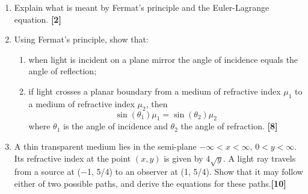 \documentclass[a4paper]{article}
\begin{document}
\newpage
\begin{qns}\leavevmode
\begin{enumerate}[label=(\alph*)]
\item Explain what is meant by Fermat’s principle and the Euler-Lagrange equation. \hfill\textbf{[2]}
\item Using Fermat’s principle, show that:
\begin{enumerate}[label=(\roman*)]
\item
when light is incident on a plane mirror the angle of incidence equals the angle of reflection;
\item if light crosses a planar boundary from a medium of refractive index $\mu_1$ to a medium of refractive index $\mu_2$, then
$$\sin(\theta_1)\mu_1=\sin(\theta_2)\mu_2$$
where $\theta_1$ is the angle of incidence and $\theta_2$ the angle of refraction. \hfill\textbf{[8]}
\end{enumerate}
\item A thin transparent medium lies in the semi-plane $−\infty < x < \infty$, $0 < y < \infty$. Its refractive index at the point $(x, y)$ is given by $4\sqrt{y}$. A light ray travels from a source at (−1, 5/4) to an observer at (1, 5/4). Show that it may follow either of two possible paths, and derive the equations for these paths.\hfill\textbf{[10]}
\end{enumerate}
\end{qns}
\end{document}
